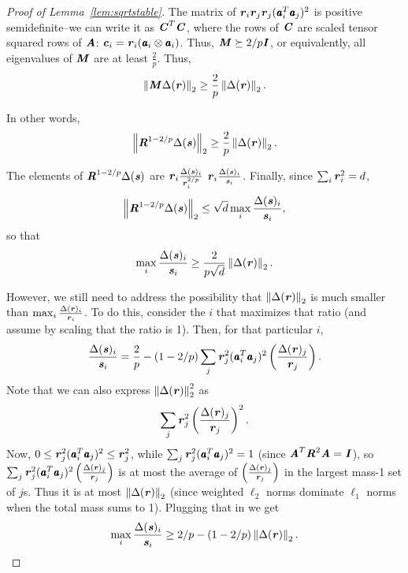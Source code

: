 \begin{proof}[Proof of Lemma~\ref{lem:sqrtstable}]
The matrix of $\rr_i \rr_j \rr_j (\aa_i^T \aa_j)^2$ is positive semidefinite--we can write it as $\CC^T \CC$,
where the rows of $\CC$ are scaled tensor squared rows of $\AA$: $\cc_i = \rr_i (\aa_i \otimes \aa_i)$.
Thus, $\MM \succeq 2/p \II$, or equivalently, all eigenvalues of $\MM$ are at least $\frac{2}{p}$.
Thus,
\begin{equation*}
\norm{\MM \Delta(\rr)}_2 \geq \frac{2}{p} \norm{\Delta(\rr)}_2.
\end{equation*}

In other words,
\begin{equation*}
\norm{\RR^{1-2/p} \Delta(\ss)}_2 \geq \frac{2}{p} \norm{\Delta(\rr)}_2.
\end{equation*}

The elements of $\RR^{1-2/p} \Delta(\ss)$ are $\rr_i \frac{\Delta(\ss)_i}{\rr_i^{2/p}}$
$\rr_i \frac{\Delta(\ss)_i}{\ss_i}$.  Finally, since $\sum_i \rr_i^2 = d$,
\begin{equation*}
\norm{\RR^{1-2/p} \Delta(\ss)}_2 \leq \sqrt{d} \max_i \frac{\Delta(\ss)_i}{\ss_i},
\end{equation*}
so that
\begin{equation}
\label{eqn:bigl2}
\max_i \frac{\Delta(\ss)_i}{\ss_i} \geq \frac{2}{p \sqrt{d}} \norm{\Delta(\rr)}_2.
\end{equation}

However, we still need to address the possibility that $\norm{\Delta(\rr)}_2$ is much smaller
than $\max_i \frac{\Delta(\rr)_i}{\rr_i}$.  To do this, consider the $i$ that maximizes that
ratio (and assume by scaling that the ratio is 1).  Then, for that particular $i$,
\begin{equation*}
\frac{\Delta(\ss)_i}{\ss_i} = \frac{2}{p} - (1-2/p) \sum_j \rr_j^2 (\aa_i^T \aa_j)^2 \left ( \frac{\Delta(\rr)_j}{\rr_j} \right ).
\end{equation*}
Note that we can also express $\norm{\Delta(\rr)}_2^2$ as
\begin{equation*}
\sum_j \rr_j^2 \left ( \frac{\Delta(\rr)_j}{\rr_j} \right )^2.
\end{equation*}
Now, $0 \leq \rr_j^2 (\aa_i^T \aa_j)^2 \leq \rr_j^2$, while $\sum_j \rr_j^2 (\aa_i^T \aa_j)^2 = 1$
(since $\AA^T \RR^2 \AA = \II$), so
$\sum_j \rr_j^2 (\aa_i^T \aa_j)^2 \left ( \frac{\Delta(\rr)_j}{\rr_j} \right )$ is at most the average
of $\left ( \frac{\Delta(\rr)_j}{\rr_j} \right )$ in the largest mass-1 set of $j$s.  Thus
it is at most $\norm{\Delta(\rr)}_2$ (since weighted $\ell_2$ norms dominate $\ell_1$ norms when the total
mass sums to 1).
Plugging that in we get
\begin{equation}
\label{eqn:smalll2}
\max_i \frac{\Delta(\ss)_i}{\ss_i} \geq 2/p - (1-2/p) \norm{\Delta(\rr)}_2.
\end{equation}


\end{proof}
